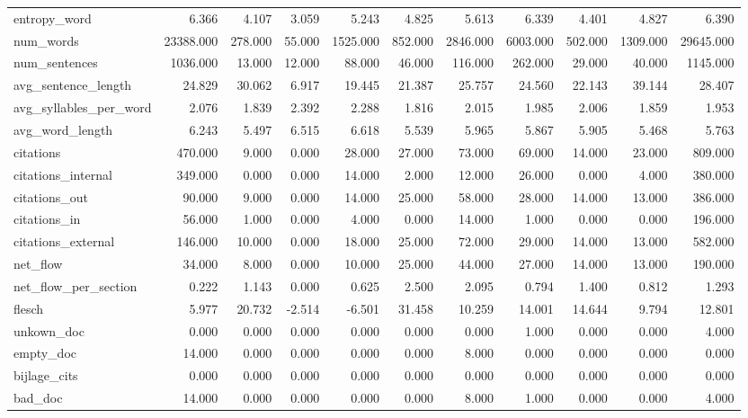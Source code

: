 \begin{tabular}{lrrrrrrrrrr}
\cline{1-11}
entropy\_word & 6.366 & 4.107 & 3.059 & 5.243 & 4.825 & 5.613 & 6.339 & 4.401 & 4.827 & 6.390 \\
\cline{1-11}
num\_words & 23388.000 & 278.000 & 55.000 & 1525.000 & 852.000 & 2846.000 & 6003.000 & 502.000 & 1309.000 & 29645.000 \\
\cline{1-11}
num\_sentences & 1036.000 & 13.000 & 12.000 & 88.000 & 46.000 & 116.000 & 262.000 & 29.000 & 40.000 & 1145.000 \\
\cline{1-11}
avg\_sentence\_length & 24.829 & 30.062 & 6.917 & 19.445 & 21.387 & 25.757 & 24.560 & 22.143 & 39.144 & 28.407 \\
\cline{1-11}
avg\_syllables\_per\_word & 2.076 & 1.839 & 2.392 & 2.288 & 1.816 & 2.015 & 1.985 & 2.006 & 1.859 & 1.953 \\
\cline{1-11}
avg\_word\_length & 6.243 & 5.497 & 6.515 & 6.618 & 5.539 & 5.965 & 5.867 & 5.905 & 5.468 & 5.763 \\
\cline{1-11}
citations & 470.000 & 9.000 & 0.000 & 28.000 & 27.000 & 73.000 & 69.000 & 14.000 & 23.000 & 809.000 \\
\cline{1-11}
citations\_internal & 349.000 & 0.000 & 0.000 & 14.000 & 2.000 & 12.000 & 26.000 & 0.000 & 4.000 & 380.000 \\
\cline{1-11}
citations\_out & 90.000 & 9.000 & 0.000 & 14.000 & 25.000 & 58.000 & 28.000 & 14.000 & 13.000 & 386.000 \\
\cline{1-11}
citations\_in & 56.000 & 1.000 & 0.000 & 4.000 & 0.000 & 14.000 & 1.000 & 0.000 & 0.000 & 196.000 \\
\cline{1-11}
citations\_external & 146.000 & 10.000 & 0.000 & 18.000 & 25.000 & 72.000 & 29.000 & 14.000 & 13.000 & 582.000 \\
\cline{1-11}
net\_flow & 34.000 & 8.000 & 0.000 & 10.000 & 25.000 & 44.000 & 27.000 & 14.000 & 13.000 & 190.000 \\
\cline{1-11}
net\_flow\_per\_section & 0.222 & 1.143 & 0.000 & 0.625 & 2.500 & 2.095 & 0.794 & 1.400 & 0.812 & 1.293 \\
\cline{1-11}
flesch & 5.977 & 20.732 & -2.514 & -6.501 & 31.458 & 10.259 & 14.001 & 14.644 & 9.794 & 12.801 \\
\cline{1-11}
unkown\_doc & 0.000 & 0.000 & 0.000 & 0.000 & 0.000 & 0.000 & 1.000 & 0.000 & 0.000 & 4.000 \\
\cline{1-11}
empty\_doc & 14.000 & 0.000 & 0.000 & 0.000 & 0.000 & 8.000 & 0.000 & 0.000 & 0.000 & 0.000 \\
\cline{1-11}
bijlage\_cits & 0.000 & 0.000 & 0.000 & 0.000 & 0.000 & 0.000 & 0.000 & 0.000 & 0.000 & 0.000 \\
\cline{1-11}
bad\_doc & 14.000 & 0.000 & 0.000 & 0.000 & 0.000 & 8.000 & 1.000 & 0.000 & 0.000 & 4.000 \\
\cline{1-11}
\bottomrule
\end{tabular}

